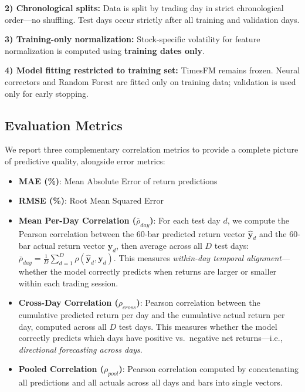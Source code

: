 \documentclass[10pt,conference]{IEEEtran}
\newcommand{\rev}[1]{#1}
\begin{document}
\textbf{2) Chronological splits:} Data is split by trading day in strict chronological order---no shuffling. Test days occur strictly after all training and validation days.

\textbf{3) Training-only normalization:} Stock-specific volatility for feature normalization is computed using \textbf{training dates only}.

\textbf{4) Model fitting restricted to training set:} TimesFM remains frozen. Neural correctors and Random Forest are fitted only on training data; validation is used only for early stopping.

\subsection{Evaluation Metrics}

\rev{We report three complementary correlation metrics to provide a complete picture of predictive quality, alongside error metrics:}

\begin{itemize}
    \item \textbf{MAE (\%)}: Mean Absolute Error of return predictions
    \item \textbf{RMSE (\%)}: Root Mean Squared Error
    \item \rev{\textbf{Mean Per-Day Correlation ($\overline{\rho}_{day}$)}: For each test day $d$, we compute the Pearson correlation between the 60-bar predicted return vector $\hat{\mathbf{y}}_d$ and the 60-bar actual return vector $\mathbf{y}_d$, then average across all $D$ test days: $\overline{\rho}_{day} = \frac{1}{D}\sum_{d=1}^{D} \rho(\hat{\mathbf{y}}_d, \mathbf{y}_d)$. This measures \textit{within-day temporal alignment}---whether the model correctly predicts when returns are larger or smaller within each trading session.}
    \item \rev{\textbf{Cross-Day Correlation ($\rho_{cross}$)}: Pearson correlation between the cumulative predicted return per day and the cumulative actual return per day, computed across all $D$ test days. This measures whether the model correctly predicts which days have positive vs.\ negative net returns---i.e., \textit{directional forecasting across days}.}
    \item \rev{\textbf{Pooled Correlation ($\rho_{pool}$)}: Pearson correlation computed by concatenating all predictions and all actuals across all days and bars into single vectors.}
\end{itemize}
\end{document}
